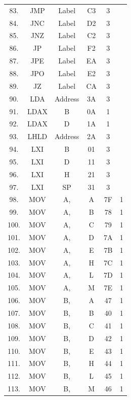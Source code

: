 \documentclass{scrreprt}
\begin{document}
\begin{longtable}{|c|c|c|c|c|c|}
83.  & JMP  & Label        & C3   & 3  &   \\
84.  & JNC  & Label        & D2   & 3  &   \\
85.  & JNZ  & Label        & C2   & 3  &   \\
86.  & JP   & Label        & F2   & 3  &   \\
87.  & JPE  & Label        & EA   & 3  &   \\
88.  & JPO  & Label        & E2   & 3  &   \\
89.  & JZ   & Label        & CA   & 3  &   \\
90.  & LDA  & Address      & 3A   & 3  &   \\
91.  & LDAX & B            & 0A   & 1  &   \\
92.  & LDAX & D            & 1A   & 1  &   \\
93.  & LHLD & Address      & 2A   & 3  &   \\
94.  & LXI  & B            & 01   & 3  &   \\
95.  & LXI  & D            & 11   & 3  &   \\
96.  & LXI  & H            & 21   & 3  &   \\
97.  & LXI  & SP           & 31   & 3  &   \\
98.  & MOV  & A,           & A    & 7F & 1 \\
99.  & MOV  & A,           & B    & 78 & 1 \\
100. & MOV  & A,           & C    & 79 & 1 \\
101. & MOV  & A,           & D    & 7A & 1 \\
102. & MOV  & A,           & E    & 7B & 1 \\
103. & MOV  & A,           & H    & 7C & 1 \\
104. & MOV  & A,           & L    & 7D & 1 \\
105. & MOV  & A,           & M    & 7E & 1 \\
106. & MOV  & B,           & A    & 47 & 1 \\
107. & MOV  & B,           & B    & 40 & 1 \\
108. & MOV  & B,           & C    & 41 & 1 \\
109. & MOV  & B,           & D    & 42 & 1 \\
110. & MOV  & B,           & E    & 43 & 1 \\
111. & MOV  & B,           & H    & 44 & 1 \\
112. & MOV  & B,           & L    & 45 & 1 \\
113. & MOV  & B,           & M    & 46 & 1 \\

\end{longtable}
\end{document}
